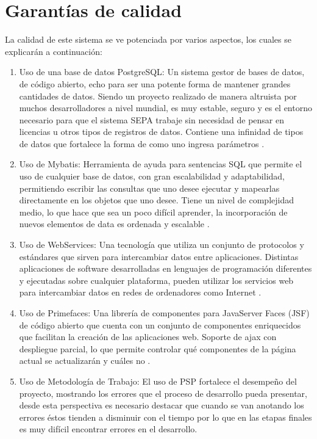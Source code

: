 \documentclass[a4paper,12pt,openany,oneside]{book}
\begin{document}
\section{Garantías de calidad}
La calidad de este sistema se ve potenciada por varios aspectos, los cuales se explicarán a continuación:

\begin{enumerate}
        \item Uso de una base de datos PostgreSQL: Un sistema gestor de bases de datos, de código abierto, echo para ser una potente forma de mantener grandes cantidades de datos. Siendo un proyecto realizado de manera altruista por muchos desarrolladores a nivel mundial, es muy estable, seguro y es el entorno necesario para que el sistema SEPA trabaje sin necesidad de pensar en licencias u otros tipos de registros de datos. Contiene una infinidad de tipos de datos que fortalece la forma de como uno ingresa parámetros \cite{data18}.
        \item Uso de Mybatis: Herramienta de ayuda para sentencias SQL que permite el uso de cualquier base de datos, con gran escalabilidad y adaptabilidad, permitiendo escribir las consultas que uno desee ejecutar y mapearlas directamente en los objetos que uno desee. Tiene un nivel de complejidad medio, lo que hace que sea un poco difícil aprender, la incorporación de nuevos elementos de data es ordenada y escalable \cite{data19}.
        \item Uso de WebServices: Una tecnología que utiliza un conjunto de protocolos y estándares que sirven para intercambiar datos entre aplicaciones. Distintas aplicaciones de software desarrolladas en lenguajes de programación diferentes y ejecutadas sobre cualquier plataforma, pueden utilizar los servicios web para intercambiar datos en redes de ordenadores como Internet \cite{data20}.
        \item Uso de Primefaces: Una librería de componentes para JavaServer Faces (JSF) de código abierto que cuenta con un conjunto de componentes enriquecidos que facilitan la creación de las aplicaciones web. Soporte de ajax con despliegue parcial, lo que permite controlar qué componentes de la página actual se actualizarán y cuáles no \cite{data21}.
        \item Uso de Metodología de Trabajo: El uso de PSP fortalece el desempeño del proyecto, mostrando los errores que el proceso de desarrollo pueda presentar, desde esta perspectiva es necesario destacar que cuando se van anotando los errores éstos tienden a disminuir con el tiempo por lo que en las etapas finales es muy difícil encontrar errores en el desarrollo.

\end{enumerate}
\end{document}
